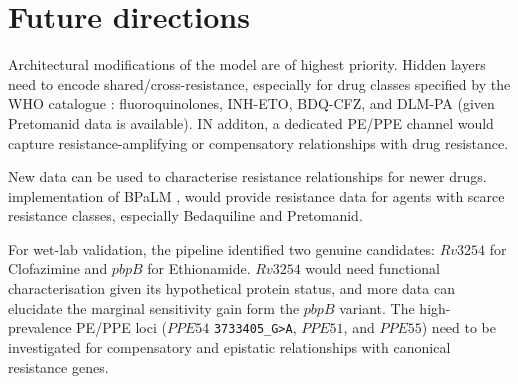 \section{Future directions}
Architectural modifications of the model are of highest priority. Hidden layers need to encode shared/cross-resistance, especially for drug classes specified by the WHO catalogue \cite{WHOcatalog}: fluoroquinolones, INH-ETO, BDQ-CFZ, and DLM-PA (given Pretomanid data is available). IN additon, a dedicated PE/PPE channel would capture resistance-amplifying or compensatory relationships with drug resistance. 

New data can be used to characterise resistance relationships for newer drugs. implementation of BPaLM \cite{queensland_health_2023}, would provide resistance data for agents with scarce resistance classes, especially Bedaquiline and Pretomanid. 

For wet-lab validation, the pipeline identified two genuine candidates: $Rv3254$ for Clofazimine and $pbpB$ for Ethionamide. $Rv3254$ would need functional characterisation given its hypothetical protein status, and more data can elucidate the marginal sensitivity gain form the $pbpB$ variant. The high-prevalence PE/PPE loci ($PPE54$ \texttt{3733405\_G>A}, $PPE51$, and $PPE55$) need to be investigated for compensatory and epistatic relationships with canonical resistance genes. 








